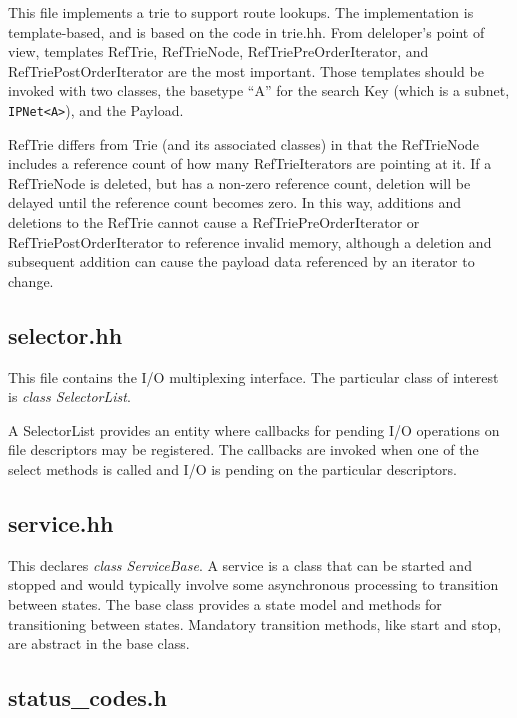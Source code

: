 \documentclass[11pt]{article}
\begin{document}
This file implements a trie to support route lookups.  The
implementation is template-based, and is based on the code in
trie.hh. From deleloper's point of view, templates RefTrie, RefTrieNode,
RefTriePreOrderIterator, and RefTriePostOrderIterator are the most important.
Those templates should be invoked
with two classes, the basetype ``A'' for the search Key (which is a
subnet, \verb=IPNet<A>=), and the Payload.

RefTrie differs from Trie (and its associated classes) in that the
RefTrieNode includes a reference count of how many RefTrieIterators
are pointing at it.  If a RefTrieNode is deleted, but has a non-zero
reference count, deletion will be delayed until the reference count
becomes zero.  In this way, additions and deletions to the RefTrie
cannot cause a RefTriePreOrderIterator or RefTriePostOrderIterator
to reference invalid memory, although a deletion and subsequent addition can
cause the payload data referenced by an iterator to change.


\subsection{selector.hh}

This file contains the I/O multiplexing interface. The particular class
of interest is \emph{class SelectorList}.

A SelectorList provides an entity where callbacks for pending I/O
operations on file descriptors may be registered.  The callbacks
are invoked when one of the select methods is called and I/O
is pending on the particular descriptors.

\subsection{service.hh}

This declares \emph{class ServiceBase}.  A service is a class that can
be started and stopped and would typically involve some asynchronous
processing to transition between states.  The base class provides a
state model and methods for transitioning between states.  Mandatory
transition methods, like start and stop, are abstract in the base
class.

\subsection{status\_codes.h}
\end{document}
